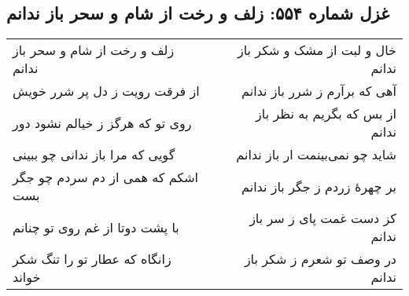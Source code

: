 \begin{center}
\section*{غزل شماره ۵۵۴: زلف و رخت از شام و سحر باز ندانم}
\label{sec:554}
\begin{longtable}{l p{0.5cm} r}
زلف و رخت از شام و سحر باز ندانم
&&
خال و لبت از مشک و شکر باز ندانم
\\
از فرقت رویت ز دل پر شرر خویش
&&
آهی که برآرم ز شرر باز ندانم
\\
روی تو که هرگز ز خیالم نشود دور
&&
از بس که بگریم به نظر باز ندانم
\\
گویی که مرا باز ندانی چو ببینی
&&
شاید چو نمی‌بینمت ار باز ندانم
\\
اشکم که همی از دم سردم چو جگر بست
&&
بر چهرهٔ زردم ز جگر باز ندانم
\\
با پشت دوتا از غم روی تو چنانم
&&
کز دست غمت پای ز سر باز ندانم
\\
زانگاه که عطار تو را تنگ شکر خواند
&&
در وصف تو شعرم ز شکر باز ندانم
\\
\end{longtable}
\end{center}
